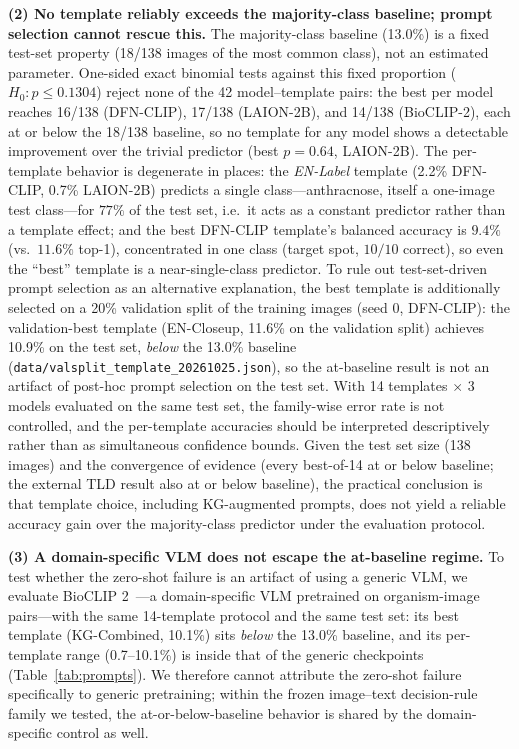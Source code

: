 \documentclass[10pt,a4paper]{article}
\begin{document}
\textbf{(2) No template reliably exceeds the majority-class baseline; prompt selection cannot rescue this.}
The majority-class baseline (13.0\%) is a fixed test-set property (18/138 images of the most common class), not an estimated parameter.
One-sided exact binomial tests against this fixed proportion ($H_0: p \leq 0.1304$) reject none of the 42 model--template pairs: the best per model reaches 16/138 (DFN-CLIP), 17/138 (LAION-2B), and 14/138 (BioCLIP-2), each at or below the 18/138 baseline, so no template for any model shows a detectable improvement over the trivial predictor (best $p=0.64$, LAION-2B). The per-template behavior is degenerate in places: the \emph{EN-Label} template (2.2\% DFN-CLIP, 0.7\% LAION-2B) predicts a single class---anthracnose, itself a one-image test class---for $77\%$ of the test set, i.e.\ it acts as a constant predictor rather than a template effect; and the best DFN-CLIP template's balanced accuracy is $9.4\%$ (vs.\ $11.6\%$ top-1), concentrated in one class (target spot, $10/10$ correct), so even the ``best'' template is a near-single-class predictor.
To rule out test-set-driven prompt selection as an alternative explanation, the best template is additionally selected on a 20\% validation split of the training images (seed 0, DFN-CLIP): the validation-best template (EN-Closeup, 11.6\% on the validation split) achieves 10.9\% on the test set, \emph{below} the 13.0\% baseline (\texttt{data/valsplit\_template\_20261025.json}), so the at-baseline result is not an artifact of post-hoc prompt selection on the test set.
With 14 templates $\times$ 3 models evaluated on the same test set, the family-wise error rate is not controlled, and the per-template accuracies should be interpreted descriptively rather than as simultaneous confidence bounds.
Given the test set size (138 images) and the convergence of evidence (every best-of-14 at or below baseline; the external TLD result also at or below baseline), the practical conclusion is that template choice, including KG-augmented prompts, does not yield a reliable accuracy gain over the majority-class predictor under the evaluation protocol.

\textbf{(3) A domain-specific VLM does not escape the at-baseline regime.}
To test whether the zero-shot failure is an artifact of using a generic VLM, we evaluate BioCLIP 2~\cite{bioclip2}---a domain-specific VLM pretrained on organism-image pairs---with the same 14-template protocol and the same test set: its best template (KG-Combined, 10.1\%) sits \emph{below} the 13.0\% baseline, and its per-template range (0.7--10.1\%) is inside that of the generic checkpoints (Table~\ref{tab:prompts}).
We therefore cannot attribute the zero-shot failure specifically to generic pretraining; within the frozen image--text decision-rule family we tested, the at-or-below-baseline behavior is shared by the domain-specific control as well.
\end{document}
